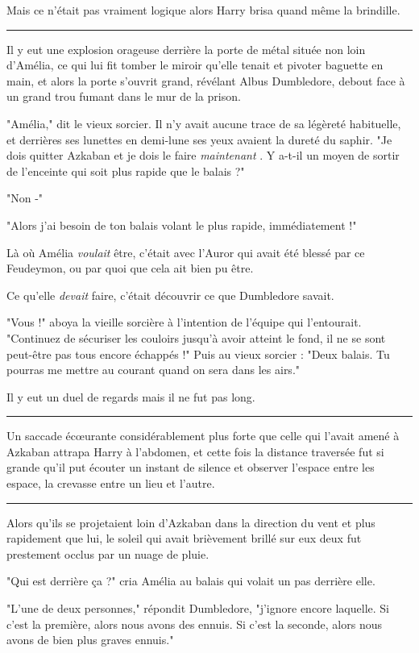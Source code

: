 Mais ce n'était pas vraiment logique alors Harry brisa quand même la brindille.
\par\noindent\rule{\textwidth}{0.4pt}
Il y eut une explosion orageuse derrière la porte de métal située non loin d'Amélia, ce qui lui fit tomber le miroir qu'elle tenait et pivoter baguette en main, et alors la porte s'ouvrit grand, révélant Albus Dumbledore, debout face à un grand trou fumant dans le mur de la prison.

"Amélia," dit le vieux sorcier. Il n'y avait aucune trace de sa légèreté habituelle, et derrières ses lunettes en demi-lune ses yeux avaient la dureté du saphir. "Je dois quitter Azkaban et je dois le faire \emph{maintenant} . Y a-t-il un moyen de sortir de l'enceinte qui soit plus rapide que le balais ?"

"Non -"

"Alors j'ai besoin de ton balais volant le plus rapide, immédiatement !"

Là où Amélia \emph{voulait}  être, c'était avec l'Auror qui avait été blessé par ce Feudeymon, ou par quoi que cela ait bien pu être.

Ce qu'elle \emph{devait}  faire, c'était découvrir ce que Dumbledore savait.

"Vous !" aboya la vieille sorcière à l'intention de l'équipe qui l'entourait. "Continuez de sécuriser les couloirs jusqu'à avoir atteint le fond, il ne se sont peut-être pas tous encore échappés !" Puis au vieux sorcier : "Deux balais. Tu pourras me mettre au courant quand on sera dans les airs."

Il y eut un duel de regards mais il ne fut pas long.
\par\noindent\rule{\textwidth}{0.4pt}
Un saccade écœurante considérablement plus forte que celle qui l'avait amené à Azkaban attrapa Harry à l'abdomen, et cette fois la distance traversée fut si grande qu'il put écouter un instant de silence et observer l'espace entre les espace, la crevasse entre un lieu et l'autre.
\par\noindent\rule{\textwidth}{0.4pt}
Alors qu'ils se projetaient loin d'Azkaban dans la direction du vent et plus rapidement que lui, le soleil qui avait brièvement brillé sur eux deux fut prestement occlus par un nuage de pluie.

"Qui est derrière ça ?" cria Amélia au balais qui volait un pas derrière elle.

"L'une de deux personnes," répondit Dumbledore, "j'ignore encore laquelle. Si c'est la première, alors nous avons des ennuis. Si c'est la seconde, alors nous avons de bien plus graves ennuis."

